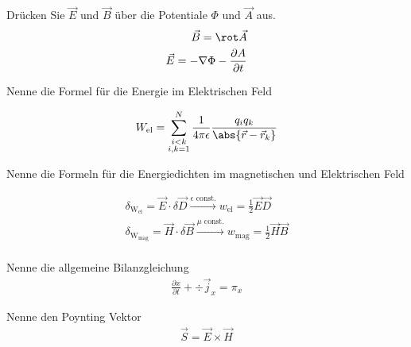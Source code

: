 \documentclass[a7paper,11pt,print,grid=front]{kartei}
\begin{document}
	
	\begin{karte}
		{Drücken Sie $\vec E$ und $\vec B$ über die Potentiale $\Phi$ und $\vec A$ aus.}
		\begin{eqnarray*}
			\vec B = \rot \vec A \\ 
			\vec E = - \nabla \Phi - \frac{\partial A}{\partial t}
		\end{eqnarray*}
	\end{karte}
	\begin{karte}{Nenne die Formel für die Energie im Elektrischen Feld}
	
		\begin{eqnarray*}
			W_{\text{el}} = \sum \limits^N_{\substack{i < k \\ i,k = 1}} \frac{1}{4 \pi \epsilon} \frac{q_i q_k}{\abs{\vec r - \vec r_k}}
		\end{eqnarray*}

	\end{karte}
	
	\begin{karte}{Nenne die Formeln für die Energiedichten im magnetischen und Elektrischen Feld}
	
		\begin{eqnarray*}
			\delta_{\text{W}_{\text{el}}} = \vec E  \cdot \delta\vec D \overset{\epsilon \text{ const.}}{\longrightarrow} w_{\text{el}} = \frac 1 2 \vec E \vec D \\
			\delta_{\text{W}_{\text{mag}}} = \vec H  \cdot \delta\vec B \overset{\mu \text{ const.}}{\longrightarrow} w_{\text{mag}} = \frac 1 2 \vec H \vec B \\
		\end{eqnarray*}

	\end{karte}
	
	\begin{karte}{Nenne die allgemeine Bilanzgleichung}
		\begin{eqnarray*}
			\frac{\partial x}{\partial t} + \div \vec j_x = \pi_x
		\end{eqnarray*}
	\end{karte}
	
	\begin{karte}{Nenne den Poynting Vektor}
		\begin{eqnarray*}
			\vec S = \vec E \times \vec H
		\end{eqnarray*}
	\end{karte}
\end{document}

